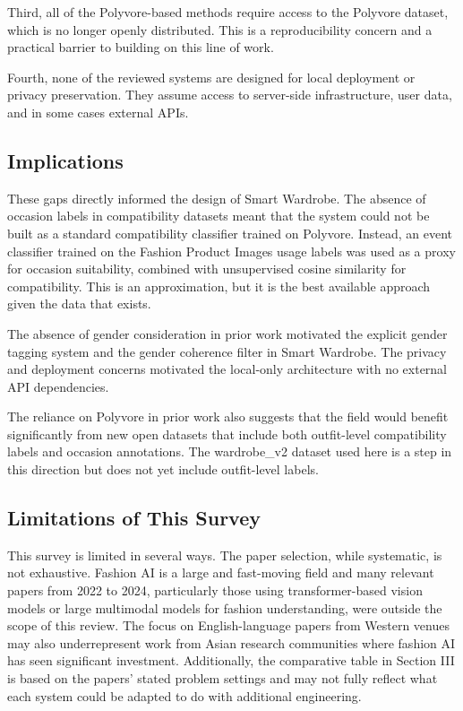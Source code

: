 \documentclass[conference]{IEEEtran}
\begin{document}
Third, all of the Polyvore-based methods require access to the Polyvore dataset, which is no longer openly distributed. This is a reproducibility concern and a practical barrier to building on this line of work.

Fourth, none of the reviewed systems are designed for local deployment or privacy preservation. They assume access to server-side infrastructure, user data, and in some cases external APIs.

\subsection{Implications}

These gaps directly informed the design of Smart Wardrobe. The absence of occasion labels in compatibility datasets meant that the system could not be built as a standard compatibility classifier trained on Polyvore. Instead, an event classifier trained on the Fashion Product Images usage labels was used as a proxy for occasion suitability, combined with unsupervised cosine similarity for compatibility. This is an approximation, but it is the best available approach given the data that exists.

The absence of gender consideration in prior work motivated the explicit gender tagging system and the gender coherence filter in Smart Wardrobe. The privacy and deployment concerns motivated the local-only architecture with no external API dependencies.

The reliance on Polyvore in prior work also suggests that the field would benefit significantly from new open datasets that include both outfit-level compatibility labels and occasion annotations. The wardrobe\_v2 dataset used here is a step in this direction but does not yet include outfit-level labels.

\subsection{Limitations of This Survey}

This survey is limited in several ways. The paper selection, while systematic, is not exhaustive. Fashion AI is a large and fast-moving field and many relevant papers from 2022 to 2024, particularly those using transformer-based vision models or large multimodal models for fashion understanding, were outside the scope of this review. The focus on English-language papers from Western venues may also underrepresent work from Asian research communities where fashion AI has seen significant investment. Additionally, the comparative table in Section III is based on the papers' stated problem settings and may not fully reflect what each system could be adapted to do with additional engineering.
\end{document}
